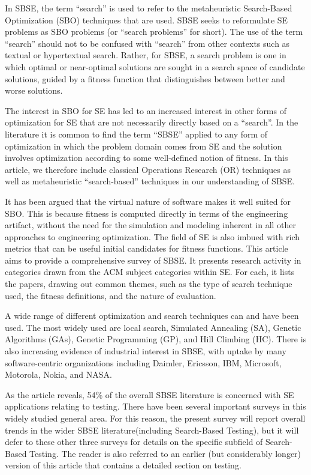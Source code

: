 \documentclass[conference]{IEEEtran}
\begin{document}
In SBSE, the term “search” is used to refer to the metaheuristic Search-Based 
Optimization (SBO) techniques that are used. SBSE seeks to reformulate SE problems as
SBO problems (or “search problems” for short). The use of the term “search” should not
to be confused with “search” from other contexts such as textual or hypertextual search.
Rather, for SBSE, a search problem is one in which optimal or near-optimal solutions
are sought in a search space of candidate solutions, guided by a fitness function that
distinguishes between better and worse solutions.

The interest in SBO for SE has led to an increased interest in other forms of optimization 
for SE that are not necessarily directly based on a “search”. In the literature
it is common to find the term “SBSE” applied to any form of optimization in which the
problem domain comes from SE and the solution involves optimization according to
some well-defined notion of fitness. In this article, we therefore include classical 
Operations Research (OR) techniques as well as metaheuristic “search-based” techniques
in our understanding of SBSE.

It has been argued that the virtual nature of software makes it well suited for
SBO. This is because fitness is computed directly in terms of the
engineering artifact, without the need for the simulation and modeling inherent in
all other approaches to engineering optimization. The field of SE is also imbued with
rich metrics that can be useful initial candidates for fitness functions. 
This article aims to provide a comprehensive survey of SBSE. It presents
research activity in categories drawn from the ACM subject categories within SE.
For each, it lists the papers, drawing out common themes, such as the type of search
technique used, the fitness definitions, and the nature of evaluation.

A wide range of different optimization and search techniques can and have been used.
The most widely used are local search, Simulated Annealing (SA), Genetic Algorithms
(GAs), Genetic Programming (GP), and Hill Climbing (HC). There is also increasing
evidence of industrial interest in SBSE, with uptake by many software-centric 
organizations including Daimler, Ericsson, IBM, Microsoft, Motorola, Nokia, and NASA.

As the article reveals, 54\% of the overall SBSE literature is concerned with SE
applications relating to testing. There have been several important surveys in this
widely studied general area. For this reason, the present survey will report overall 
trends in the wider SBSE literature(including Search-Based Testing), but it will defer 
to these other three surveys for details on the specific subfield of Search-Based Testing. 
The reader is also referred to an earlier (but considerably longer) version of this 
article that contains a detailed section on testing.
\end{document}
